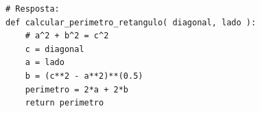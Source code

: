 \ifmostrarGabarito
\begin{verbatim}
# Resposta:
def calcular_perimetro_retangulo( diagonal, lado ):
    # a^2 + b^2 = c^2
    c = diagonal
    a = lado
    b = (c**2 - a**2)**(0.5)
    perimetro = 2*a + 2*b
    return perimetro
\end{verbatim}
\fi
